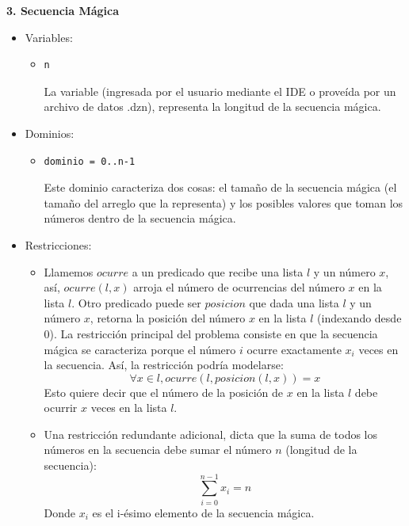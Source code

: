 \documentclass[12pt]{article}
\begin{document}
\newpage

\begin{flushleft}
\textbf{3. Secuencia Mágica}
\end{flushleft}

\begin{itemize}
\item Variables:
\begin{itemize}
\item \begin{verbatim}
n
\end{verbatim} La variable (ingresada por el usuario mediante el IDE o proveída por un archivo de datos .dzn), representa la longitud de la secuencia mágica.
\end{itemize}
\item Dominios:
\begin{itemize}
\item \begin{verbatim}
dominio = 0..n-1
\end{verbatim} Este dominio caracteriza dos cosas: el tamaño de la secuencia mágica (el tamaño del arreglo que la representa) y los posibles valores que toman los números dentro de la secuencia mágica.
\end{itemize}
\item Restricciones:
\begin{itemize}
\item Llamemos $ocurre$ a un predicado que recibe una lista $l$ y un número $x$, así, $ocurre(l,x)$ arroja el número de ocurrencias del número $x$ en la lista $l$. Otro predicado puede ser $posicion$ que dada una lista $l$ y un número $x$, retorna la posición del número $x$ en la lista $l$ (indexando desde 0). La restricción principal del problema consiste en que la secuencia mágica se caracteriza porque el número $i$ ocurre exactamente $x_{i}$ veces en la secuencia. Así, la restricción podría modelarse:
\begin{equation*}
\forall x \in l, ocurre(l, posicion(l, x)) = x
\end{equation*}
Esto quiere decir que el número de la posición de $x$ en la lista $l$ debe ocurrir $x$ veces en la lista $l$.
\item Una restricción redundante adicional, dicta que la suma de todos los números en la secuencia debe sumar el número $n$ (longitud de la secuencia):
\begin{equation*}
\sum_{i=0}^{n-1} x_{i} = n
\end{equation*}
Donde $x_{i}$ es el i-ésimo elemento de la secuencia mágica.

\end{itemize}
\end{itemize}
\end{document}

